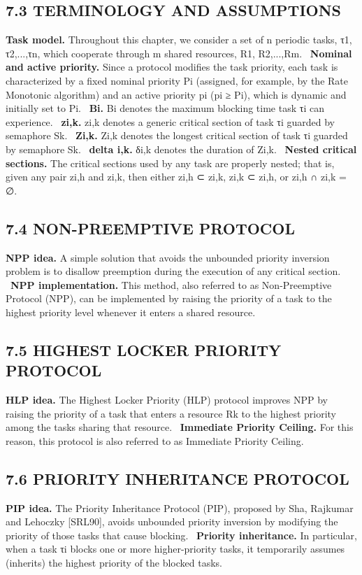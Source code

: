 \documentclass[conference]{IEEEtran}
\begin{document}
\subsection{7.3 TERMINOLOGY AND ASSUMPTIONS}
\textbf{Task model.} Throughout this chapter, we consider a set of n periodic tasks, τ1, τ2,...,τn, which cooperate through m shared resources, R1, R2,...,Rm. \cite{Buttazzo2011}\
\textbf{Nominal and active priority.} Since a protocol modifies the task priority, each task is characterized by a fixed nominal priority Pi (assigned, for example, by the Rate Monotonic algorithm) and an active priority pi (pi ≥ Pi), which is dynamic and initially set to Pi. \cite{Buttazzo2011}\
\textbf{Bi.} Bi denotes the maximum blocking time task τi can experience. \cite{Buttazzo2011}\
\textbf{zi,k.} zi,k denotes a generic critical section of task τi guarded by semaphore Sk. \cite{Buttazzo2011}\
\textbf{Zi,k.} Zi,k denotes the longest critical section of task τi guarded by semaphore Sk. \cite{Buttazzo2011}\
\textbf{delta i,k.} δi,k denotes the duration of Zi,k. \cite{Buttazzo2011}\
\textbf{Nested critical sections.} The critical sections used by any task are properly nested; that is, given any pair zi,h and zi,k, then either zi,h ⊂ zi,k, zi,k ⊂ zi,h, or zi,h ∩ zi,k = ∅. \cite{Buttazzo2011}\
\subsection{7.4 NON-PREEMPTIVE PROTOCOL}
\textbf{NPP idea.} A simple solution that avoids the unbounded priority inversion problem is to disallow preemption during the execution of any critical section. \cite{Buttazzo2011}\
\textbf{NPP implementation.} This method, also referred to as Non-Preemptive Protocol (NPP), can be implemented by raising the priority of a task to the highest priority level whenever it enters a shared resource. \cite{Buttazzo2011}\
\subsection{7.5 HIGHEST LOCKER PRIORITY PROTOCOL}
\textbf{HLP idea.} The Highest Locker Priority (HLP) protocol improves NPP by raising the priority of a task that enters a resource Rk to the highest priority among the tasks sharing that resource. \cite{Buttazzo2011}\
\textbf{Immediate Priority Ceiling.} For this reason, this protocol is also referred to as Immediate Priority Ceiling. \cite{Buttazzo2011}\
\subsection{7.6 PRIORITY INHERITANCE PROTOCOL}
\textbf{PIP idea.} The Priority Inheritance Protocol (PIP), proposed by Sha, Rajkumar and Lehoczky [SRL90], avoids unbounded priority inversion by modifying the priority of those tasks that cause blocking. \cite{Buttazzo2011}\
\textbf{Priority inheritance.} In particular, when a task τi blocks one or more higher-priority tasks, it temporarily assumes (inherits) the highest priority of the blocked tasks. \cite{Buttazzo2011}\
\end{document}
